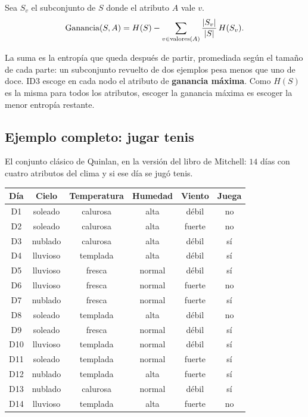 \documentclass[11pt,letterpaper]{article}
\begin{document}
\begin{definicion}
    Sea $S_v$ el subconjunto de $S$ donde el atributo $A$ vale $v$.
    \[
        \text{Ganancia}(S, A) = H(S)
            - \sum_{v \in \text{valores}(A)}
              \frac{\left\lvert S_v \right\rvert}{\left\lvert S \right\rvert}\, H(S_v) .
    \]
\end{definicion}

La suma es la entropía que queda después de partir, promediada según
el tamaño de cada parte: un subconjunto revuelto de dos ejemplos pesa
menos que uno de doce. ID3 escoge en cada nodo el atributo de
\textbf{ganancia máxima}. Como $H(S)$ es la misma para todos los
atributos, escoger la ganancia máxima es escoger la menor entropía
restante.


\subsection*{Ejemplo completo: jugar tenis}

El conjunto clásico de Quinlan, en la versión del libro de Mitchell:
$14$ días con cuatro atributos del clima y si ese día se jugó tenis.

\begin{center}
\small
\begin{tabular}{cccccc}
    \toprule
    \textbf{Día} & \textbf{Cielo} & \textbf{Temperatura}
        & \textbf{Humedad} & \textbf{Viento} & \textbf{Juega} \\
    \midrule
    D1  & soleado  & calurosa & alta   & débil  & no \\
    D2  & soleado  & calurosa & alta   & fuerte & no \\
    D3  & nublado  & calurosa & alta   & débil  & sí \\
    D4  & lluvioso & templada & alta   & débil  & sí \\
    D5  & lluvioso & fresca   & normal & débil  & sí \\
    D6  & lluvioso & fresca   & normal & fuerte & no \\
    D7  & nublado  & fresca   & normal & fuerte & sí \\
    D8  & soleado  & templada & alta   & débil  & no \\
    D9  & soleado  & fresca   & normal & débil  & sí \\
    D10 & lluvioso & templada & normal & débil  & sí \\
    D11 & soleado  & templada & normal & fuerte & sí \\
    D12 & nublado  & templada & alta   & fuerte & sí \\
    D13 & nublado  & calurosa & normal & débil  & sí \\
    D14 & lluvioso & templada & alta   & fuerte & no \\
    \bottomrule
\end{tabular}
\end{center}
\end{document}
